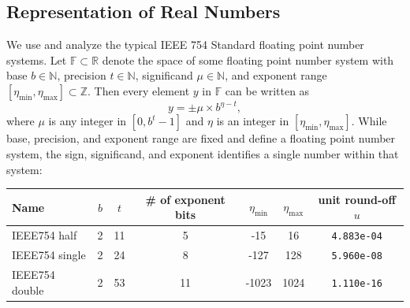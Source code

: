 \documentclass[review,onefignum,onetabnum]{siamart190516}
\newcommand{\R}{\mathbb{R}}
\newcommand{\F}{\mathbb{F}}
\begin{document}
\subsection{Representation of Real Numbers}

We use and analyze the typical IEEE 754 Standard floating point number systems.
Let $\F \subset \R$ denote the space of some floating point number system with base $b\in\mathbb{N}$, precision $t\in\mathbb{N}$, significand $\mu\in\mathbb{N}$, and exponent range $[\eta_{\text{min}}, \eta_{\text{max}}]\subset \mathbb{Z}$.
Then every element $y$ in $\F$ can be written as 
\begin{equation}
y = \pm \mu\times b^{\eta-t}, %
\label{eqn:FPbasic}
\end{equation} 
where $\mu$ is any integer in $[0,b^{t}-1]$ and $\eta$ is an integer in  $[\eta_{\text{min}}, \eta_{\text{max}}]$.
While base, precision, and exponent range are fixed and define a floating point number system, the sign, significand, and exponent identifies a single number within that system:

\vspace{.2cm}
\begin{center}
	\begin{tabular}{||l|c|c|c|c|c|c||} 
		\hline 
		Name & $b$ & $t$ & \# of exponent bits & $\eta_{\text{min}}$ & $\eta_{\text{max}}$ & unit round-off $u$ \\ \hline 
		IEEE754 half & 2 & 11 & 5 & -15 & 16  & {\tt 4.883e-04} \\ \hline 
		IEEE754 single & 2 & 24 & 8 & -127 & 128  & {\tt 5.960e-08} \\ \hline 
		IEEE754 double& 2 & 53 & 11 & -1023 & 1024 & {\tt 1.110e-16} \\ \hline 
	\end{tabular}
\end{center}
\vspace{.2cm}
\end{document}

